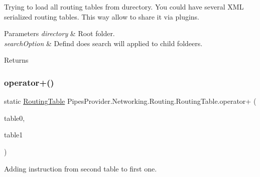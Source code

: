 Trying to load all routing tables from durectory. You could have several X\+ML serialized routing tables. This way allow to share it via plugins. 


\begin{DoxyParams}{Parameters}
{\em directory} & Root folder.\\
\hline
{\em search\+Option} & Defind does search will applied to child foldeers.\\
\hline
\end{DoxyParams}
\begin{DoxyReturn}{Returns}

\end{DoxyReturn}
\mbox{\label{class_pipes_provider_1_1_networking_1_1_routing_1_1_routing_table_a515b9ad19dc868afb6d47c762064fd96}} 
\subsubsection{\texorpdfstring{operator+()}{operator+()}}
{\footnotesize\ttfamily static \mbox{\hyperlink{class_pipes_provider_1_1_networking_1_1_routing_1_1_routing_table}{Routing\+Table}} Pipes\+Provider.\+Networking.\+Routing.\+Routing\+Table.\+operator+ (\begin{DoxyParamCaption}\item[{\mbox{\hyperlink{class_pipes_provider_1_1_networking_1_1_routing_1_1_routing_table}{Routing\+Table}}}]{table0,  }\item[{\mbox{\hyperlink{class_pipes_provider_1_1_networking_1_1_routing_1_1_routing_table}{Routing\+Table}}}]{table1 }\end{DoxyParamCaption})\hspace{0.3cm}{\ttfamily [static]}}



Adding instruction from second table to first one. 


